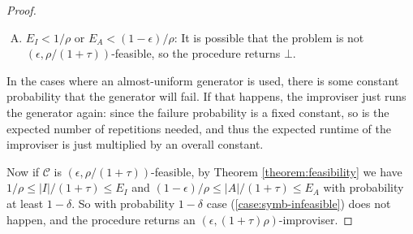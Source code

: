 \documentclass[a4paper,USenglish,numberwithinsect]{lipics}
\theoremstyle{plain}
\theoremstyle{definition}
\newcommand{\improvs}{I}
\newcommand{\valids}{A}
\begin{document}
\begin{proof}
\begin{enumerate}[(A)]
\item $E_{\improvs} < 1/\rho$ or $E_{\valids} < (1-\epsilon) / \rho$: It is possible that the problem is not $(\epsilon, \rho/(1+\tau))$-feasible, so the procedure returns $\bot$.
\end{enumerate}
In the cases where an almost-uniform generator is used, there is some constant probability that the generator will fail. If that happens, the improviser just runs the generator again: since the failure probability is a fixed constant, so is the expected number of repetitions needed, and thus the expected runtime of the improviser is just multiplied by an overall constant.

Now if $\mathcal{C}$ is $(\epsilon, \rho/(1+\tau))$-feasible, by Theorem \ref{theorem:feasibility} we have $1/\rho \le |\improvs| / (1+\tau) \le E_{\improvs}$ and $(1-\epsilon) / \rho \le |\valids| / (1+\tau) \le E_{\valids}$ with probability at least $1-\delta$. So with probability $1-\delta$ case (\ref{case:symb-infeasible}) does not happen, and the procedure returns an $(\epsilon, (1+\tau) \rho)$-improviser.
\end{proof}
\end{document}
